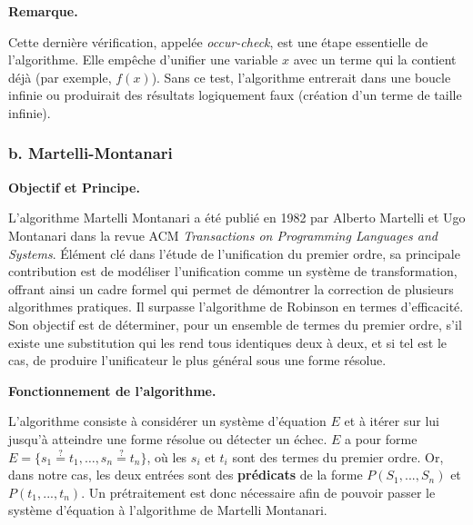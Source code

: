 \documentclass[11pt]{article}
\newenvironment{remarque}{%
    \begin{mdframed}[
        linecolor=sectioncolor!40,
        linewidth=0.8pt,
        backgroundcolor=sectioncolor!5,
        innerleftmargin=10pt,
        innerrightmargin=10pt,
        innertopmargin=6pt,
        innerbottommargin=6pt,
        skipabove=8pt,
        skipbelow=8pt
    ]
    \noindent\textbf{\small\color{sectioncolor}Remarque.}\enspace\small\itshape
}{%
    \end{mdframed}
}
\begin{document}
\begin{remarque}
    Cette dernière vérification, appelée \textit{occur-check}, est une étape essentielle de l'algorithme. Elle empêche d'unifier une variable $x$ avec un terme qui la contient déjà (par exemple, $f(x)$). Sans ce test, l'algorithme entrerait dans une boucle infinie ou produirait des résultats logiquement faux (création d'un terme de taille infinie).
\end{remarque}


\newpage

\subsubsection*{\hspace{4em}b. Martelli-Montanari}
\label{martelli_montanari}

\vspace{0.4cm}
\noindent\textbf{Objectif et Principe.}

\vspace{0.2cm}
L’algorithme Martelli Montanari a été publié en 1982 par Alberto Martelli et Ugo
Montanari dans la revue ACM \textit{Transactions on Programming Languages and Systems}.
Élément clé dans l’étude de l’unification du premier ordre, sa principale contribution est
de modéliser l'unification comme un système de transformation, offrant ainsi un cadre
formel qui permet de démontrer la correction de plusieurs algorithmes pratiques. Il
surpasse l'algorithme de Robinson en termes d'efficacité. Son objectif est de
déterminer, pour un ensemble de termes du premier ordre, s'il existe une substitution
qui les rend tous identiques deux à deux, et si tel est le cas, de produire l'unificateur le
plus général sous une forme résolue.

\vspace{0.4cm}
\noindent\textbf{Fonctionnement de l'algorithme.}

\vspace{0.2cm}
L'algorithme consiste à considérer un système d'équation $E$ et à itérer sur lui jusqu'à atteindre une forme résolue ou détecter un échec. $E$ a pour forme $E = \{ s_1 \overset{?}{=} t_1, \dots, s_n \overset{?}{=} t_n \}$, où les $s_i$ et $t_i$ sont des termes du premier ordre. Or, dans notre cas, les deux entrées sont des \textbf{prédicats} de la forme $P(S_1, ..., S_n)$ et $P(t_1, ..., t_n)$. Un prétraitement est donc nécessaire afin de pouvoir passer le système d'équation à l'algorithme de Martelli Montanari.
\end{document}
